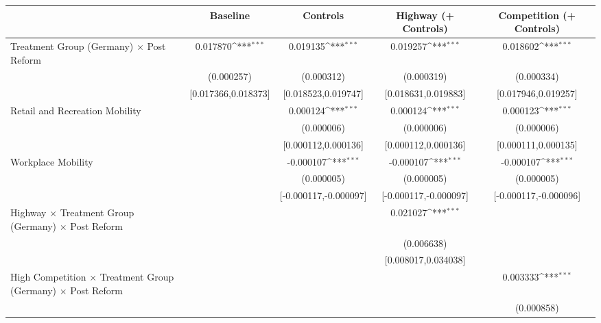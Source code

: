 {
\def\sym#1{\ifmmode^{#1}\else\(^{#1}\)\fi}
\begin{tabular}{l*{4}{c}}
\toprule
                    &\multicolumn{1}{c}{Baseline}&\multicolumn{1}{c}{Controls}&\multicolumn{1}{c}{Highway (+ Controls)}&\multicolumn{1}{c}{Competition (+ Controls)}\\
\midrule
Treatment Group (Germany) $\times$ Post Reform&    0.017870\sym{***}&    0.019135\sym{***}&    0.019257\sym{***}&    0.018602\sym{***}\\
                    &  (0.000257)         &  (0.000312)         &  (0.000319)         &  (0.000334)         \\
                    &[0.017366,0.018373]         &[0.018523,0.019747]         &[0.018631,0.019883]         &[0.017946,0.019257]         \\
Retail and Recreation Mobility&                     &    0.000124\sym{***}&    0.000124\sym{***}&    0.000123\sym{***}\\
                    &                     &  (0.000006)         &  (0.000006)         &  (0.000006)         \\
                    &                     &[0.000112,0.000136]         &[0.000112,0.000136]         &[0.000111,0.000135]         \\
Workplace Mobility  &                     &   -0.000107\sym{***}&   -0.000107\sym{***}&   -0.000107\sym{***}\\
                    &                     &  (0.000005)         &  (0.000005)         &  (0.000005)         \\
                    &                     &[-0.000117,-0.000097]         &[-0.000117,-0.000097]         &[-0.000117,-0.000096]         \\
Highway $\times$ Treatment Group (Germany) $\times$ Post Reform&                     &                     &    0.021027\sym{***}&                     \\
                    &                     &                     &  (0.006638)         &                     \\
                    &                     &                     &[0.008017,0.034038]         &                     \\
High Competition $\times$ Treatment Group (Germany) $\times$ Post Reform&                     &                     &                     &    0.003333\sym{***}\\
                    &                     &                     &                     &  (0.000858)         \\

\end{tabular}}
